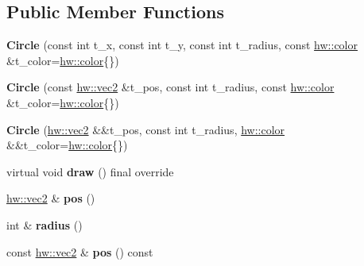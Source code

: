 \subsection*{Public Member Functions}
\begin{DoxyCompactItemize}
\item 
\mbox{\label{classdummy__api_1_1Circle_a30f357e3eeff959a4d3634b8065844d3}} 
{\bfseries Circle} (const int t\+\_\+x, const int t\+\_\+y, const int t\+\_\+radius, const \mbox{\hyperlink{structhw_1_1color}{hw\+::color}} \&t\+\_\+color=\mbox{\hyperlink{structhw_1_1color}{hw\+::color}}\{\})
\item 
\mbox{\label{classdummy__api_1_1Circle_a126bb794a26aa8d1e1913f0e5cb95a8c}} 
{\bfseries Circle} (const \mbox{\hyperlink{structhw_1_1vec2}{hw\+::vec2}} \&t\+\_\+pos, const int t\+\_\+radius, const \mbox{\hyperlink{structhw_1_1color}{hw\+::color}} \&t\+\_\+color=\mbox{\hyperlink{structhw_1_1color}{hw\+::color}}\{\})
\item 
\mbox{\label{classdummy__api_1_1Circle_ae9867e6638a89fc0fb7dcaad3b9a611d}} 
{\bfseries Circle} (\mbox{\hyperlink{structhw_1_1vec2}{hw\+::vec2}} \&\&t\+\_\+pos, const int t\+\_\+radius, \mbox{\hyperlink{structhw_1_1color}{hw\+::color}} \&\&t\+\_\+color=\mbox{\hyperlink{structhw_1_1color}{hw\+::color}}\{\})
\item 
\mbox{\label{classdummy__api_1_1Circle_a35ba5450b33540ab9a836525e96db7a3}} 
virtual void {\bfseries draw} () final override
\item 
\mbox{\label{classdummy__api_1_1Circle_abeb7bea611614c56b69ae2afc48e9806}} 
\mbox{\hyperlink{structhw_1_1vec2}{hw\+::vec2}} \& {\bfseries pos} ()
\item 
\mbox{\label{classdummy__api_1_1Circle_a9af19fd3b8662e2aaa0b481acbc24b2e}} 
int \& {\bfseries radius} ()
\item 
\mbox{\label{classdummy__api_1_1Circle_a54ffe8b738150e9a0d3ca4fa57051631}} 
const \mbox{\hyperlink{structhw_1_1vec2}{hw\+::vec2}} \& {\bfseries pos} () const
\item 
\mbox{\label{classdummy__api_1_1Circle_a6457ea736dd30bfc503bc693e3747d1c}} 

\end{DoxyCompactItemize}
